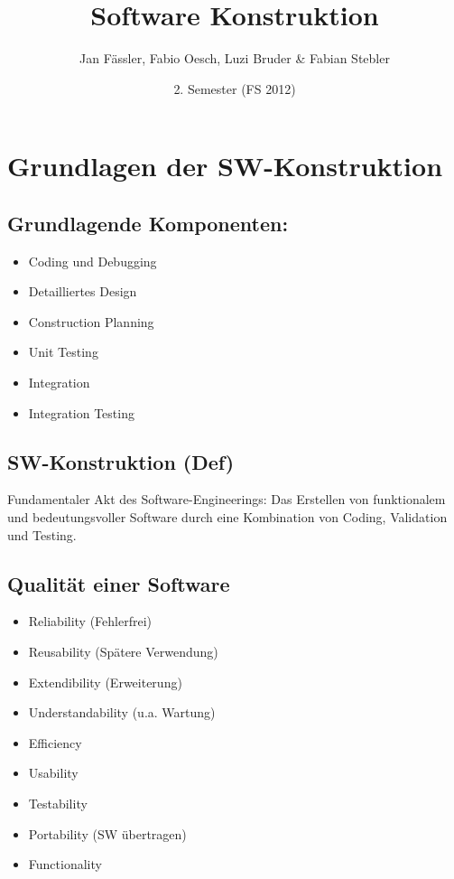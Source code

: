 \documentclass[a4paper,10pt]{article}
\title{Software Konstruktion}
\author{Jan F\"assler, Fabio Oesch, Luzi Bruder \& Fabian Stebler}
\date{2. Semester (FS 2012)}
\begin{document}
\maketitle
\thispagestyle{fancy}

\newpage

\tableofcontents	  	


\newpage
\setcounter{page}{1}

\newpage
\setcounter{page}{1} 
\section{Grundlagen der SW-Konstruktion}
\subsection{Grundlagende Komponenten:}
\begin{itemize}
 \item Coding und Debugging
 \item Detailliertes Design
 \item Construction Planning
 \item Unit Testing
 \item Integration
 \item Integration Testing
\end{itemize}
\subsection{SW-Konstruktion (Def)}
Fundamentaler Akt des Software-Engineerings: Das Erstellen von funktionalem und bedeutungsvoller Software durch eine Kombination von Coding, Validation und Testing.

\subsection{Qualit\"at einer Software}
\begin{itemize}
 \item Reliability (Fehlerfrei)
 \item Reusability (Sp\"atere Verwendung)
 \item Extendibility (Erweiterung)
 \item Understandability (u.a. Wartung)
 \item Efficiency 
 \item Usability
 \item Testability
 \item Portability (SW \"ubertragen)
 \item Functionality
\end{itemize}
\end{document}
